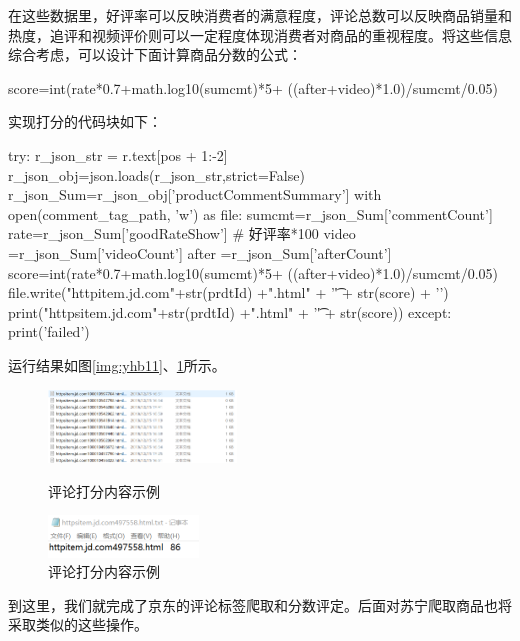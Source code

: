 在这些数据里，好评率可以反映消费者的满意程度，评论总数可以反映商品销量和热度，追评和视频评价则可以一定程度体现消费者对商品的重视程度。将这些信息综合考虑，可以设计下面计算商品分数的公式：

\begin{python}
score=int(rate*0.7+math.log10(sumcmt)*5+
                          ((after+video)*1.0)/sumcmt/0.05)
\end{python}

实现打分的代码块如下：
\begin{python}
    try:
        r_json_str = r.text[pos + 1:-2]
        r_json_obj=json.loads(r_json_str,strict=False)
        r_json_Sum=r_json_obj['productCommentSummary']
        with open(comment_tag_path, 'w') as file:
            sumcmt=r_json_Sum['commentCount']
            rate=r_json_Sum['goodRateShow'] # 好评率*100
            video =r_json_Sum['videoCount']
            after =r_json_Sum['afterCount']
            score=int(rate*0.7+math.log10(sumcmt)*5+
                          ((after+video)*1.0)/sumcmt/0.05)
            file.write("httpitem.jd.com"+str(prdtId) +".html"
                       + '\t' + str(score) + '\n')
            print("httpsitem.jd.com"+str(prdtId) +".html"
                       + '\t' + str(score))
    except:
        print('failed')
\end{python}

运行结果如图\ref{img:yhb11}、\ref{img:yhb12}所示。



\begin{figure}[htbp]
\centering
\begin{minipage}[t]{0.48\textwidth}
\centering
\includegraphics[width=5cm]{img/yhb/res1_jd.png}
\caption{评论打分内容示例}
\label{img:yhb11}
\end{minipage}
\begin{minipage}[t]{0.48\textwidth}
\centering
\includegraphics[width=4cm]{img/yhb/res2_jd.png}
\caption{评论打分内容示例}
\label{img:yhb12} 
\end{minipage}
\end{figure}   %


到这里，我们就完成了京东的评论标签爬取和分数评定。后面对苏宁爬取商品也将采取类似的这些操作。
